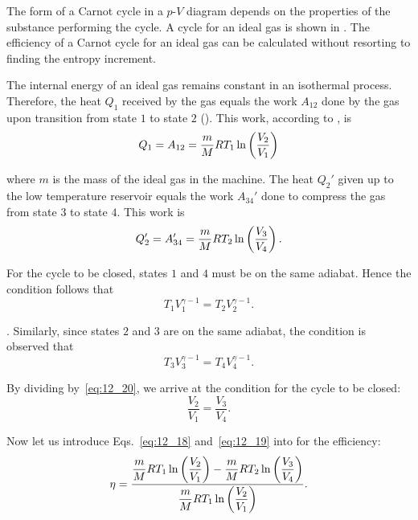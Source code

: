 The form of a Carnot cycle in a $p$-$V$ diagram depends on the properties of the substance performing the cycle. A cycle for an ideal gas is shown in . The efficiency of a Carnot cycle for an ideal gas can be calculated without resorting to finding the entropy increment.

The internal energy of an ideal gas remains constant in an isothermal process. Therefore, the heat $Q_1$ received by the gas equals the work $A_{12}$ done by the gas upon transition from state $1$ to state $2$ (). This work, according to , is
\begin{equation}\label{eq:12_18}
	Q_1 = A_{12} = \frac{m}{M}RT_1 \ln\left(\frac{V_2}{V_1}\right)
\end{equation}

\noindent
where $m$ is the mass of the ideal gas in the machine. The heat $Q_2'$ given up to the low temperature reservoir equals the work $A_{34}'$ done to compress the gas from state $3$ to state $4$. This work is
\begin{equation}\label{eq:12_19}
	Q_2' = A_{34}' = \frac{m}{M}RT_2 \ln\left(\frac{V_3}{V_4}\right).
\end{equation}

For the cycle to be closed, states $1$ and $4$ must be on the same adiabat. Hence the condition follows that
\begin{equation}\label{eq:12_20}
	T_1 V_1^{\gamma-1} = T_2 V_2^{\gamma-1}.
\end{equation}

. Similarly, since states $2$ and $3$ are on the same adiabat, the condition is observed that
\begin{equation}\label{eq:12_21}
	T_3 V_3^{\gamma-1} = T_4 V_4^{\gamma-1}.
\end{equation}

\noindent
By dividing  by~\eqref{eq:12_20}, we arrive at the condition for the cycle to be closed:
\vspace{-12pt}
\begin{equation}\label{eq:12_22}
	\frac{V_2}{V_1} = \frac{V_3}{V_4}.
\end{equation}

Now let us introduce Eqs.~\eqref{eq:12_18} and~\eqref{eq:12_19} into  for the efficiency:
\begin{equation*}
	\eta = \frac{\dfrac{m}{M}RT_1\ln\left(\dfrac{V_2}{V_1}\right) - \dfrac{m}{M}RT_2\ln\left(\dfrac{V_3}{V_4}\right)}{\dfrac{m}{M}RT_1\ln\left(\dfrac{V_2}{V_1}\right)}.
\end{equation*}

